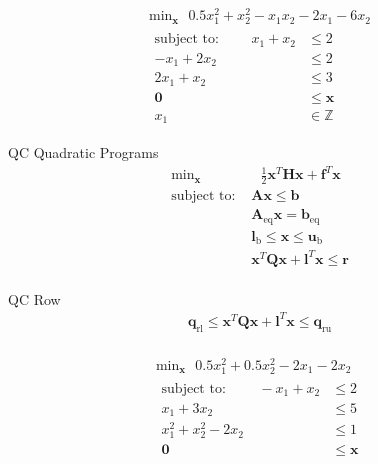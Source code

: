 \documentclass{article}
\begin{document}
\begin{align*}
    \text{min}_{\mathbf{x}} \text{ } 0.5x_1^2 + x_2^2 - x_1x_2 - 2x_1 - 6x_2\\
    \begin{aligned}
    \mbox{subject to: } \qquad x_1 + x_2 &\le 2\\
                        -x_1 + 2x_2 &\le 2\\
                        2x_1 + x_2 &\le 3\\
                        \mathbf{0} &\le \mathbf{x}\\
                        x_1 &\in \mathbb{Z}
    \end{aligned}
\end{align*}

QC Quadratic Programs
\begin{align*}
    \text{min}_{\mathbf{x}}& \text{ } \frac{1}{2}\mathbf{x}^T \mathbf{H} \mathbf{x} + \mathbf{f}^T \mathbf{x} \\
    \mbox{subject to: }& \mathbf{A}\mathbf{x} \le \mathbf{b}\\
                       & \mathbf{A}_\text{eq}\mathbf{x} = \mathbf{b}_\text{eq}\\
                       & \mathbf{l}_{\text{b}} \le \mathbf{x} \le \mathbf{u}_{\text{b}}\\
                       & \mathbf{x}^T \mathbf{Q} \mathbf{x} + \mathbf{l}^T \mathbf{x} \le \mathbf{r}\\
\end{align*}

QC Row
\begin{align*}
\mathbf{q}_\text{rl} \le \mathbf{x}^T \mathbf{Q} \mathbf{x} + \mathbf{l}^T \mathbf{x} \le \mathbf{q}_\text{ru}\\
\end{align*}

\begin{align*}
    \text{min}_{\mathbf{x}} \text{ } 0.5x_1^2 + 0.5x_2^2 - 2x_1 - 2x_2\\
    \begin{aligned}
    \mbox{subject to: } \qquad -x_1 + x_2 &\le 2\\
                        x_1 + 3x_2 &\le 5\\
                        x_1^2 + x_2^2 - 2x_2 &\le 1\\
                        \mathbf{0} &\le \mathbf{x}\\
    \end{aligned}
\end{align*}
\end{document}
